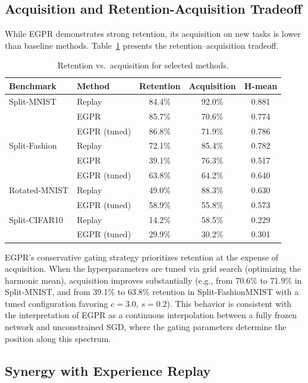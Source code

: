 \documentclass[11pt,a4paper]{article}
\begin{document}
\subsection{Acquisition and Retention-Acquisition Tradeoff}

While EGPR demonstrates strong retention, its acquisition on new tasks is lower than baseline methods. Table~\ref{tab:tradeoff} presents the retention--acquisition tradeoff.

\begin{table}[htbp]
\centering
\caption{Retention vs.\ acquisition for selected methods.}
\label{tab:tradeoff}
\begin{tabular}{llccc}
\toprule
Benchmark & Method & Retention & Acquisition & H-mean \\
\midrule
Split-MNIST & Replay & 84.4\% & 92.0\% & 0.881 \\
 & EGPR & 85.7\% & 70.6\% & 0.774 \\
 & EGPR (tuned) & 86.8\% & 71.9\% & 0.786 \\
\midrule
Split-Fashion & Replay & 72.1\% & 85.4\% & 0.782 \\
 & EGPR & 39.1\% & 76.3\% & 0.517 \\
 & EGPR (tuned) & 63.8\% & 64.2\% & 0.640 \\
\midrule
Rotated-MNIST & Replay & 49.0\% & 88.3\% & 0.630 \\
 & EGPR (tuned) & 58.9\% & 55.8\% & 0.573 \\
\midrule
Split-CIFAR10 & Replay & 14.2\% & 58.5\% & 0.229 \\
 & EGPR (tuned) & 29.9\% & 30.2\% & 0.301 \\
\bottomrule
\end{tabular}
\end{table}

EGPR's conservative gating strategy prioritizes retention at the expense of acquisition. When the hyperparameters are tuned via grid search (optimizing the harmonic mean), acquisition improves substantially (e.g., from 70.6\% to 71.9\% in Split-MNIST, and from 39.1\% to 63.8\% retention in Split-FashionMNIST with a tuned configuration favoring $c = 3.0$, $s = 0.2$). This behavior is consistent with the interpretation of EGPR as a continuous interpolation between a fully frozen network and unconstrained SGD, where the gating parameters determine the position along this spectrum.

\subsection{Synergy with Experience Replay}
\end{document}
